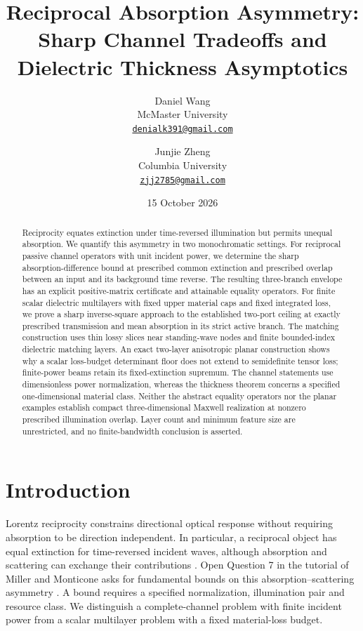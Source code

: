 \documentclass[11pt,a4paper]{article}
\title{Reciprocal Absorption Asymmetry:\\Sharp Channel Tradeoffs and Dielectric Thickness Asymptotics}
\author{Daniel Wang\\McMaster University\\\href{mailto:denialk391@gmail.com}{\texttt{denialk391@gmail.com}}
\and Junjie Zheng\\Columbia University\\\href{mailto:zjj2785@gmail.com}{\texttt{zjj2785@gmail.com}}}
\date{15 October 2026}
\theoremstyle{remark}
\begin{document}
\maketitle
\begin{abstract}
Reciprocity equates extinction under time-reversed illumination but permits unequal absorption. We quantify this asymmetry in two monochromatic settings. For reciprocal passive channel operators with unit incident power, we determine the sharp absorption-difference bound at prescribed common extinction and prescribed overlap between an input and its background time reverse. The resulting three-branch envelope has an explicit positive-matrix certificate and attainable equality operators. For finite scalar dielectric multilayers with fixed upper material caps and fixed integrated loss, we prove a sharp inverse-square approach to the established two-port ceiling at exactly prescribed transmission and mean absorption in its strict active branch. The matching construction uses thin lossy slices near standing-wave nodes and finite bounded-index dielectric matching layers. An exact two-layer anisotropic planar construction shows why a scalar loss-budget determinant floor does not extend to semidefinite tensor loss; finite-power beams retain its fixed-extinction supremum. The channel statements use dimensionless power normalization, whereas the thickness theorem concerns a specified one-dimensional material class. Neither the abstract equality operators nor the planar examples establish compact three-dimensional Maxwell realization at nonzero prescribed illumination overlap. Layer count and minimum feature size are unrestricted, and no finite-bandwidth conclusion is asserted.
\end{abstract}

\section{Introduction}
Lorentz reciprocity constrains directional optical response without requiring absorption to be direction independent. In particular, a reciprocal object has equal extinction for time-reversed incident waves, although absorption and scattering can exchange their contributions \citep{SounasAlu2014}. Open Question 7 in the tutorial of Miller and Monticone asks for fundamental bounds on this absorption--scattering asymmetry \citep{MillerMonticone2026}. A bound requires a specified normalization, illumination pair and resource class. We distinguish a complete-channel problem with finite incident power from a scalar multilayer problem with a fixed material-loss budget.
\end{document}

